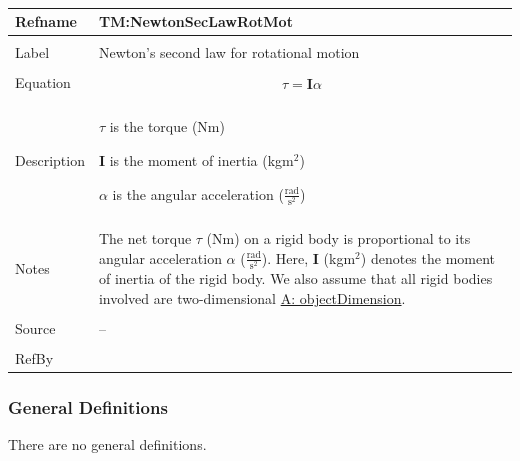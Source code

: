 \documentclass[12pt]{article}
\begin{document}
\par~

\noindent \begin{minipage}{\textwidth}
          \begin{tabular}{>{\raggedright}p{}>{\raggedright\arraybackslash}p{}}
          \toprule \textbf{Refname} & \textbf{TM:NewtonSecLawRotMot}
          \label{TM:NewtonSecLawRotMot}
          \\ \midrule \\
          Label & Newton's second law for rotational motion
          \\ \midrule \\
          Equation & \begin{displaymath}
                     τ=\mathbf{I} α
                     \end{displaymath}
          \\ \midrule \\
          Description & \begin{symbDescription}
                        \item{$τ$ is the torque (Nm)}
                        \item{$\mathbf{I}$ is the moment of inertia (kg$\text{m}^{2}$)}
                        \item{$α$ is the angular acceleration ($\frac{\text{rad}}{\text{s}^{2}}$)}
                        \end{symbDescription}
          \\ \midrule \\
          Notes & The net torque $τ$ (Nm) on a rigid body is proportional to its angular acceleration $α$ ($\frac{\text{rad}}{\text{s}^{2}}$). Here, $\mathbf{I}$ (kg$\text{m}^{2}$) denotes the moment of inertia of the rigid body. We also assume that all rigid bodies involved are two-dimensional \hyperref[assumpOD]{A: objectDimension}.
          \\ \midrule \\
          Source & --
          \\ \midrule \\
          RefBy & 
          \\ \bottomrule
          \end{tabular}
          \end{minipage}
\subsubsection{General Definitions}
\label{Sec:GDs}
There are no general definitions.
\end{document}

